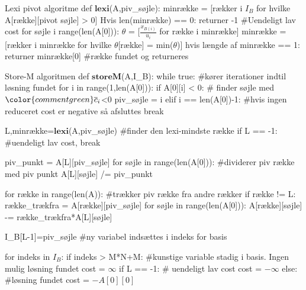 \begin{alg}[label={alg:lexi}]{Lexi pivot algoritme}
def $\textbf{lexi}$(A,piv_søjle):
	minrække = [rækker i $I_B$ for hvilke A[række][pivot søjle] > 0]
	Hvis len(minrække) == 0:
		returner -1 #Uendeligt lav cost
	for søjle i range(len(A[0])):
		$\theta$ = [$\frac{x_{B(i)}}{u_i}$ for række i minrække]
		minrække = [rækker i minrække for hvilke $\theta$[række] = min($\theta$)]
		hvis længde af minrække == 1:
			returner minrække[0] #række fundet og returneres

\end{alg}


\begin{alg}[label={alg:storem2}]{Store-M algoritmen}
def $\textbf{storeM}$(A,I_B):
    while true: #kører iterationer indtil løsning fundet
    	for i in range(1,len(A[0])): 
        	if A[0][i] < 0: # finder søjle med ${\color{commentgreen} \overline{c}_i}$<0
            	piv_søjle = i
        	elif i == len(A[0])-1: #hvis ingen reduceret cost er negative så afsluttes
				break
            
    	L,minrække=$\textbf{lexi}$(A,piv_søjle) #finder den lexi-mindste række
    	if L == -1: #uendeligt lav cost,
			break
            
    	piv_punkt = A[L][piv_søjle] 
    	for søjle in range(len(A[0])): #dividerer piv række med piv punkt
        	A[L][søjle] /= piv_punkt
            
    	for række in range(len(A)): #trækker piv række fra andre rækker
        	if række != L:
            	række_trækfra = A[række][piv_søjle]
            	for søjle in range(len(A[0])):
                	A[række][søjle] -= række_trækfra*A[L][søjle]

    	I_B[L-1]=piv_søjle #ny variabel indsættes i indeks for basis

	for indeks in $I_B$: 
		if indeks > M*N+M: #kunstige variable stadig i basis. Ingen mulig løsning fundet
			cost = $\infty$
	if L == -1: # uendeligt lav cost
		cost = $-\infty$
	else: #løsning fundet
		cost = $-A[0][0]$
\end{alg}